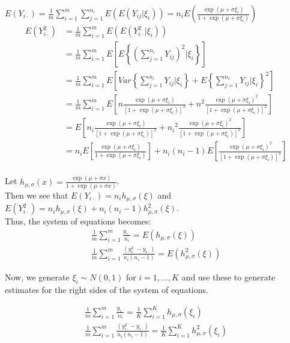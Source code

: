 \documentclass[11pt]{article}\usepackage[]{graphicx}\usepackage[]{color}
\begin{document}
$E(Y_{i\cdot})=\frac{1}{m}\sum_{i=1}^m\sum_{j=1}^{n_i} E(E(Y_{ij}|\xi_i))=n_iE\left(\frac{\exp(\mu+\sigma\xi_i)}{1+\exp(\mu+\sigma\xi_i)}\right)$\\
\begin{align*}
E(Y_{i\cdot}^2)&=\frac{1}{m}\sum_{i=1}^m E(E(Y_{i\cdot}^2|\xi_i))\\
&=\frac{1}{m}\sum_{i=1}^m E\left[E\left\{\left(\sum_{j=1}^{n_i} Y_{ij}\right)^2|\xi_i\right\}\right]\\
&=\frac{1}{m}\sum_{i=1}^m E\left[Var\left\{\sum_{j=1}^{n_i} Y_{ij}|\xi_i\right\}+E\left\{\sum_{j=1}^{n_i} Y_{ij}|\xi_i\right\}^2\right]\\
&=\frac{1}{m}\sum_{i=1}^m E\left[n\frac{\exp(\mu+\sigma\xi_i)}{[1+\exp(\mu+\sigma\xi_i)]^2}+n^2 \frac{\exp(\mu+\sigma\xi_i)^2}{[1+\exp(\mu+\sigma\xi_i)]^2}\right]\\
&= E\left[n_i\frac{\exp(\mu+\sigma\xi_i)}{[1+\exp(\mu+\sigma\xi_i)]^2}+{n_i}^2 \frac{\exp(\mu+\sigma\xi_i)^2}{[1+\exp(\mu+\sigma\xi_i)]^2}\right]\\
&= n_iE\left[\frac{\exp(\mu+\sigma\xi_i)}{1+\exp(\mu+\sigma\xi_i)}\right]+n_i(n_i-1)E\left[ \frac{\exp(\mu+\sigma\xi_i)^2}{[1+\exp(\mu+\sigma\xi_i)]^2}\right]\\
\end{align*}

Let $h_{\mu,\sigma}(x)=\frac{\exp(\mu+\sigma x)}{1+\exp(\mu+\sigma x)}$.\\  Then we see that $E(Y_{i\cdot})=n_ih_{\mu,\sigma}(\xi)$ and  $E(Y_{i\cdot}^2)=n_ih_{\mu,\sigma}(\xi)+n_i(n_i-1)h_{\mu,\sigma}^2(\xi)$.\\

Thus, the system of equations becomes:
\begin{align*}
\frac{1}{m}\sum_{i=1}^m \frac{y_{i\cdot}}{n_i}=E(h_{\mu,\sigma}(\xi))\\
\frac{1}{m}\sum_{i=1}^m \frac{(y_{i\cdot}^2-y_{i\cdot})}{n_i(n_i-1)}=E(h_{\mu,\sigma}^2(\xi))
\end{align*}

Now, we generate $\xi_i \sim N(0,1)$ for $i=1,...,K$ and use these to generate estimates for the right sides of the system of equations. 

\begin{align*}
\frac{1}{m}\sum_{i=1}^m \frac{y_{i\cdot}}{n_i}=\frac{1}{K}\sum_{i=1}^K h_{\mu,\sigma}(\xi_i)\\
\frac{1}{m}\sum_{i=1}^m \frac{(y_{i\cdot}^2-y_{i\cdot})}{n_i(n_i-1)}=\frac{1}{K}\sum_{i=1}^K h_{\mu,\sigma}^2(\xi_i)
\end{align*}
\end{document}
